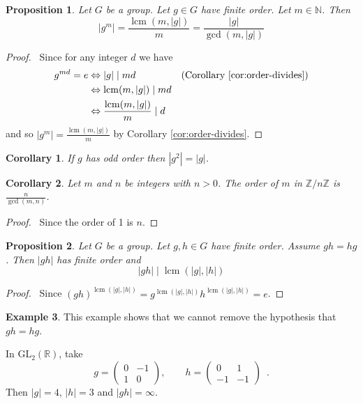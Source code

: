 \documentclass{book}
\let\qed\relax
\newtheorem{prop}{Proposition}[chapter]
\newtheorem{cor}{Corollary}[prop]
\theoremstyle{definition}
\newtheorem{ex}[prop]{Example}
\newcommand{\lcm}{\ensuremath{\operatorname{lcm}}}
\begin{document}
\begin{prop}
    Let $G$ be a group. Let $g \in G$ have finite order. Let $m \in \mathbb{N}$. Then
    \[ |g^m| = \frac{\lcm(m,|g|)}{m} = \frac{|g|}{\gcd(m,|g|)}\]
\end{prop}

\begin{proof}
    \pf\ Since for any integer $d$ we have
    \begin{align*}
        g^{md} = e & \Leftrightarrow |g| \mid md & (\text{Corollary \ref{cor:order-divides}})\\
        & \Leftrightarrow \lcm(m,|g|) \mid md \\
        & \Leftrightarrow \frac{\lcm(m,|g|)}{m} \mid d & \qed
    \end{align*}
    and so $|g^m| = \frac{\lcm(m,|g|)}{m}$ by Corollary \ref{cor:order-divides}. \qed
\end{proof}

\begin{cor}
    If $g$ has odd order then $|g^2| = |g|$.
\end{cor}

\begin{cor}
    \label{cor:order-of-m-in-ZnZ}
    Let $m$ and $n$ be integers with $n > 0$. The order of $m$ in $\mathbb{Z} / n \mathbb{Z}$ is $\frac{n}{\gcd(m,n)}$.
\end{cor}

\begin{proof}
    \pf\ Since the order of 1 is $n$. \qed
\end{proof}

\begin{prop}
    \label{prop:order-gh}
    Let $G$ be a group. Let $g,h \in G$ have finite order. Assume $gh = hg$. Then $|gh|$ has finite order and 
    \[ |gh| \mid \lcm(|g|,|h|)\]
\end{prop}

\begin{proof}
    \pf\ Since $(gh)^{\lcm(|g|,|h|)} = g^{\lcm(|g|,|h|)}h^{\lcm(|g|,|h|)} = e$. \qed
\end{proof}

\begin{ex}
    This example shows that we cannot remove the hypothesis that $gh = hg$.

    In $\mathrm{GL}_2(\mathbb{R})$, take
    \[ g = \left( \begin{array}{cc} 0 & -1 \\ 1 & 0 \end{array} \right), \qquad
        h = \left( \begin{array}{cc} 0 & 1 \\ -1 & -1 \end{array} \right) \enspace . \]
    Then $|g| = 4$, $|h| = 3$ and $|gh| = \infty$.
\end{ex}
\end{document}
